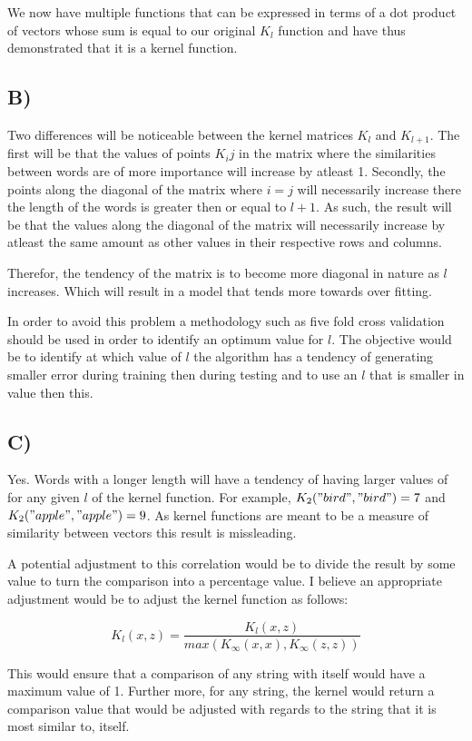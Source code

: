 \documentclass{report}
\begin{document}
We now have multiple functions that can
be expressed in terms of a dot product of vectors whose sum is equal to our original $K_l$
function and have thus demonstrated that it is a kernel function.

\subsection*{B)}
Two differences will be noticeable between the kernel matrices $K_l$ and $K_{l+1}$.
The first will be that the values of points $K_ij$ in the matrix where the similarities
between words are of more importance will increase by atleast 1. Secondly, the points
along the diagonal of the matrix where $i=j$ will necessarily increase there the
length of the words is greater then or equal to $l+1$. As such, the result will be that
the values along the diagonal of the matrix will necessarily increase by atleast
the same amount as other values in their respective rows and columns.

Therefor, the tendency of the matrix is to become more diagonal in nature as $l$
increases. Which will result in a model that tends more towards over fitting.

In order to avoid this problem a methodology such as five fold cross validation
should be used in order to identify an optimum value for $l$. The objective would be
to identify at which value of $l$ the algorithm has a tendency of generating smaller
error during training then during testing and to use an $l$ that is smaller in value
then this.
\subsection*{C)}
Yes. Words with a longer length will have a tendency of having larger values of
for any given $l$ of the kernel function. For example, $K_2("bird","bird")=7$ and
$K_2("apple","apple")=9$. As kernel functions are meant to be a measure of
similarity between vectors this result is missleading.

A potential adjustment to this correlation would be to divide the result by some
value to turn the comparison into a percentage value. I believe an appropriate adjustment
would be to adjust the kernel function as follows:

\begin{equation}
  K_l(x, z) = \frac{K_l(x, z)}{max(K_{\infty}(x, x),K_{\infty}(z, z))}
\end{equation}

This would ensure that a comparison of any string with itself would have a maximum value of 1.
Further more, for any string, the kernel would return a comparison value that would
be adjusted with regards to the string that it is most similar to, itself.
\end{document}
